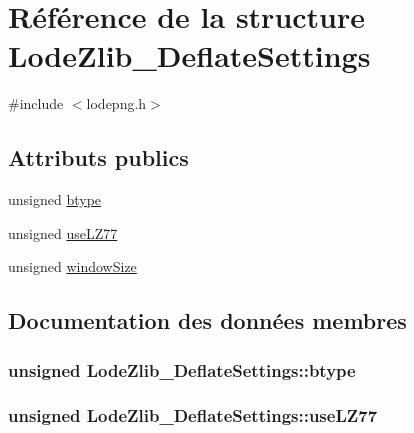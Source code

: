 \hypertarget{struct_lode_zlib___deflate_settings}{}\section{Référence de la structure Lode\+Zlib\+\_\+\+Deflate\+Settings}
\label{struct_lode_zlib___deflate_settings}


{\ttfamily \#include $<$lodepng.\+h$>$}

\subsection*{Attributs publics}
\begin{DoxyCompactItemize}
\item 
unsigned \hyperlink{struct_lode_zlib___deflate_settings_a9a016a3b62b8efae335eb585f7f40cfd}{btype}
\item 
unsigned \hyperlink{struct_lode_zlib___deflate_settings_a71f933aad07b4d940716c7873c771c95}{use\+L\+Z77}
\item 
unsigned \hyperlink{struct_lode_zlib___deflate_settings_ab4db0ff77376a9a8b9af7f85cafc6028}{window\+Size}
\end{DoxyCompactItemize}


\subsection{Documentation des données membres}
\hypertarget{struct_lode_zlib___deflate_settings_a9a016a3b62b8efae335eb585f7f40cfd}{}
\subsubsection[{btype}]{\setlength{\rightskip}{0pt plus 5cm}unsigned Lode\+Zlib\+\_\+\+Deflate\+Settings\+::btype}\label{struct_lode_zlib___deflate_settings_a9a016a3b62b8efae335eb585f7f40cfd}
\hypertarget{struct_lode_zlib___deflate_settings_a71f933aad07b4d940716c7873c771c95}{}
\subsubsection[{use\+L\+Z77}]{\setlength{\rightskip}{0pt plus 5cm}unsigned Lode\+Zlib\+\_\+\+Deflate\+Settings\+::use\+L\+Z77}\label{struct_lode_zlib___deflate_settings_a71f933aad07b4d940716c7873c771c95}
\hypertarget{struct_lode_zlib___deflate_settings_ab4db0ff77376a9a8b9af7f85cafc6028}{}
